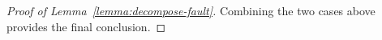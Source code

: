 \begin{proof}[Proof of Lemma~\ref{lemma:decompose-fault}]


	


	Combining the two cases above provides the final conclusion.
\end{proof}

